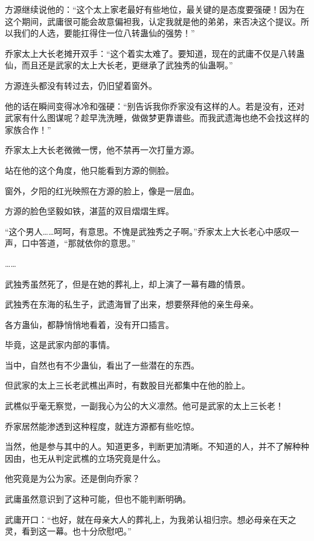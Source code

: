
\begin{this_body}

方源继续说他的：“这个太上家老最好有些地位，最关键的是态度要强硬！因为在这个期间，武庸很可能会故意偏袒我，认定我就是他的弟弟，来否决这个提议。所以我们的人选，要能扛得住一位八转蛊仙的强势！”

乔家太上大长老摊开双手：“这个着实太难了。要知道，现在的武庸不仅是八转蛊仙，而且还是武家的太上大长老，更继承了武独秀的仙蛊啊。”

方源连头都没有转过去，仍旧望着窗外。

他的话在瞬间变得冰冷和强硬：“别告诉我你乔家没有这样的人。若是没有，还对武家有什么图谋呢？趁早洗洗睡，做做梦更靠谱些。而我武遗海也绝不会找这样的家族合作！”

乔家太上大长老微微一愣，他不禁再一次打量方源。

站在他的这个角度，他只能看到方源的侧脸。

窗外，夕阳的红光映照在方源的脸上，像是一层血。

方源的脸色坚毅如铁，湛蓝的双目熠熠生辉。

“这个男人……呵呵，有意思。不愧是武独秀之子啊。”乔家太上大长老心中感叹一声，口中答道，“那就依你的意思。”

……

武独秀虽然死了，但是在她的葬礼上，却上演了一幕有趣的情景。

武独秀在东海的私生子，武遗海冒了出来，想要祭拜他的亲生母亲。

各方蛊仙，都静悄悄地看着，没有开口插言。

毕竟，这是武家内部的事情。

当中，自然也有不少蛊仙，看出了一些潜在的东西。

但武家的太上三长老武樵出声时，有数股目光都集中在他的脸上。

武樵似乎毫无察觉，一副我心为公的大义凛然。他可是武家的太上三长老！

乔家居然能渗透到这种程度，就连方源都有些吃惊。

当然，他是参与其中的人。知道更多，判断更加清晰。不知道的人，并不了解种种因由，也无从判定武樵的立场究竟是什么。

他究竟是为公为家。还是倒向乔家？

武庸虽然意识到了这种可能，但也不能判断明确。

武庸开口：“也好，就在母亲大人的葬礼上，为我弟认祖归宗。想必母亲在天之灵，看到这一幕。也十分欣慰吧。”


\end{this_body}
